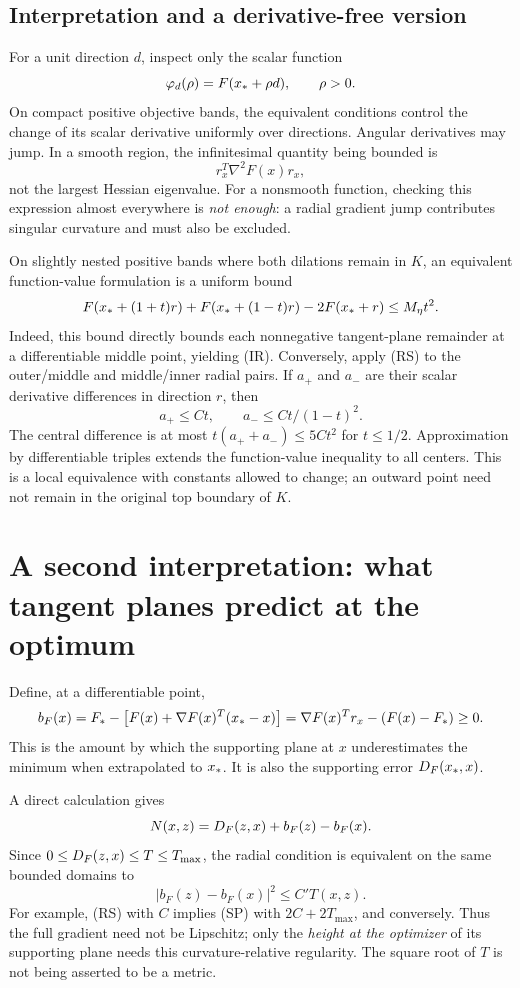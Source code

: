 \subsection{Interpretation and a derivative-free version}
For a unit direction $d$, inspect only the scalar function
\[
 \varphi_d(\rho)=F(x_*+\rho d),\qquad \rho>0.
\]
On compact positive objective bands, the equivalent conditions control the change of its scalar derivative uniformly over directions. Angular derivatives may jump. In a smooth region, the infinitesimal quantity being bounded is
\[
 r_x^T\nabla^2F(x)r_x,
\]
not the largest Hessian eigenvalue. For a nonsmooth function, checking this expression almost everywhere is \emph{not enough}: a radial gradient jump contributes singular curvature and must also be excluded.

On slightly nested positive bands where both dilations remain in $K$, an equivalent function-value formulation is a uniform bound
\begin{equation}
 F(x_*+(1+t)r)+F(x_*+(1-t)r)-2F(x_*+r)\le M_\eta t^2.
 \label{R:eq:central}
\end{equation}
Indeed, this bound directly bounds each nonnegative tangent-plane remainder at a differentiable middle point, yielding (IR). Conversely, apply (RS) to the outer/middle and middle/inner radial pairs. If $a_+$ and $a_-$ are their scalar derivative differences in direction $r$, then
\[
 a_+\le C t,\qquad a_-\le Ct/(1-t)^2.
\]
The central difference is at most $t(a_++a_-)\le5Ct^2$ for $t\le1/2$. Approximation by differentiable triples extends the function-value inequality to all centers. This is a local equivalence with constants allowed to change; an outward point need not remain in the original top boundary of $K$.


\setcounter{section}{2}
\setcounter{theorem}{0}
\setcounter{equation}{4}
\section{A second interpretation: what tangent planes predict at the optimum}
Define, at a differentiable point,
\[
 b_F(x)=F_*-\bigl[F(x)+\nabla F(x)^T(x_*-x)\bigr]
       =\nabla F(x)^Tr_x-(F(x)-F_*)\ge0.
\]
This is the amount by which the supporting plane at $x$ underestimates the minimum when extrapolated to $x_*$. It is also the supporting error $D_F(x_*,x)$.

A direct calculation gives
\begin{equation}
 N(x,z)=D_F(z,x)+b_F(z)-b_F(x).
 \label{R:eq:intercept}
\end{equation}
Since $0\le D_F(z,x)\le T\le T_{\max}$, the radial condition is equivalent on the same bounded domains to
\begin{equation}
 |b_F(z)-b_F(x)|^2\le C' T(x,z).
 \tag{R.SP}\label{R:eq:SP}
\end{equation}
For example, (RS) with $C$ implies (SP) with $2C+2T_{\max}$, and conversely. Thus the full gradient need not be Lipschitz; only the \emph{height at the optimizer} of its supporting plane needs this curvature-relative regularity. The square root of $T$ is not being asserted to be a metric.

